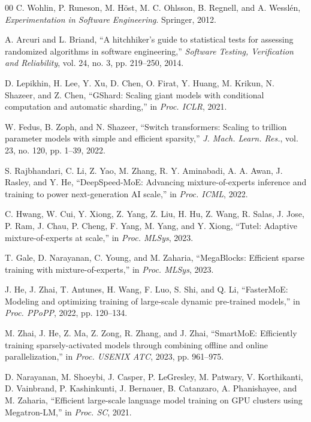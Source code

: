 \documentclass[10pt,conference]{IEEEtran}
\begin{document}
\begin{thebibliography}{00}
 C. Wohlin, P. Runeson, M. H{\"o}st, M. C. Ohlsson, B. Regnell, and A. Wessl{\'e}n, \textit{Experimentation in Software Engineering}. Springer, 2012.

 A. Arcuri and L. Briand, ``A hitchhiker's guide to statistical tests for assessing randomized algorithms in software engineering,'' \textit{Software Testing, Verification and Reliability}, vol. 24, no. 3, pp. 219--250, 2014.

 D. Lepikhin, H. Lee, Y. Xu, D. Chen, O. Firat, Y. Huang, M. Krikun, N. Shazeer, and Z. Chen, ``GShard: Scaling giant models with conditional computation and automatic sharding,'' in \textit{Proc. ICLR}, 2021.

 W. Fedus, B. Zoph, and N. Shazeer, ``Switch transformers: Scaling to trillion parameter models with simple and efficient sparsity,'' \textit{J. Mach. Learn. Res.}, vol. 23, no. 120, pp. 1--39, 2022.

 S. Rajbhandari, C. Li, Z. Yao, M. Zhang, R. Y. Aminabadi, A. A. Awan, J. Rasley, and Y. He, ``DeepSpeed-MoE: Advancing mixture-of-experts inference and training to power next-generation AI scale,'' in \textit{Proc. ICML}, 2022.

 C. Hwang, W. Cui, Y. Xiong, Z. Yang, Z. Liu, H. Hu, Z. Wang, R. Salas, J. Jose, P. Ram, J. Chau, P. Cheng, F. Yang, M. Yang, and Y. Xiong, ``Tutel: Adaptive mixture-of-experts at scale,'' in \textit{Proc. MLSys}, 2023.

 T. Gale, D. Narayanan, C. Young, and M. Zaharia, ``MegaBlocks: Efficient sparse training with mixture-of-experts,'' in \textit{Proc. MLSys}, 2023.

 J. He, J. Zhai, T. Antunes, H. Wang, F. Luo, S. Shi, and Q. Li, ``FasterMoE: Modeling and optimizing training of large-scale dynamic pre-trained models,'' in \textit{Proc. PPoPP}, 2022, pp. 120--134.

 M. Zhai, J. He, Z. Ma, Z. Zong, R. Zhang, and J. Zhai, ``SmartMoE: Efficiently training sparsely-activated models through combining offline and online parallelization,'' in \textit{Proc. USENIX ATC}, 2023, pp. 961--975.

 D. Narayanan, M. Shoeybi, J. Casper, P. LeGresley, M. Patwary, V. Korthikanti, D. Vainbrand, P. Kashinkunti, J. Bernauer, B. Catanzaro, A. Phanishayee, and M. Zaharia, ``Efficient large-scale language model training on GPU clusters using Megatron-LM,'' in \textit{Proc. SC}, 2021.


\end{thebibliography}
\end{document}
